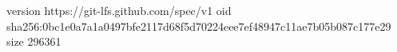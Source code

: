 version https://git-lfs.github.com/spec/v1
oid sha256:0bc1e0a7a1a0497bfe2117d68f5d70224eee7ef48947c11ae7b05b087c177e29
size 296361
